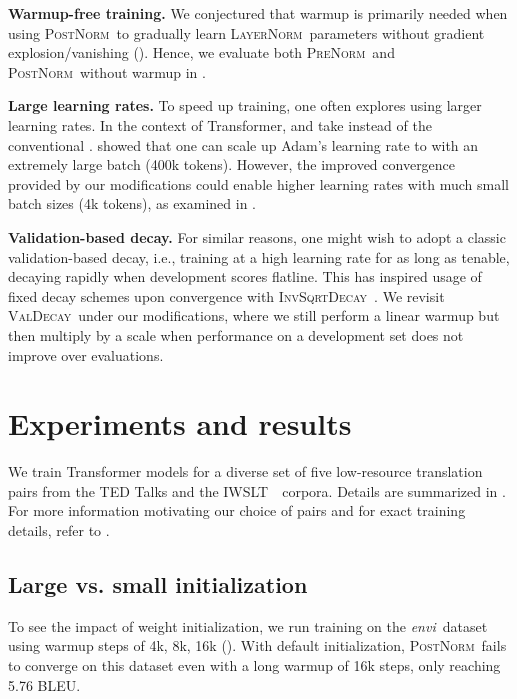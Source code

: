 \documentclass[11pt,a4paper]{article}
\newcommand{\enTOvi}{\textit{en\textrightarrow vi}}
\newcommand{\LNorm}{\textsc{LayerNorm}}
\newcommand{\PreNorm}{\textsc{PreNorm}}
\newcommand{\PostNorm}{\textsc{PostNorm}}
\newcommand{\ORGLR}{\textsc{InvSqrtDecay}}
\newcommand{\VALBASED}{\textsc{ValDecay}}
\newcommand{\IWSLT}{IWSLT\,\textquotesingle 15}
\renewcommand{\paragraph}[1]{\par\medskip\noindent\textbf{#1}}
\begin{document}
\paragraph{Warmup-free training.} We conjectured that warmup is primarily needed when using \PostNorm\ to gradually learn \LNorm\ parameters without gradient explosion/vanishing (). Hence, we evaluate both \PreNorm\ and \PostNorm\ without warmup in .

\paragraph{Large learning rates.} To speed up training, one often explores using larger learning rates. In the context of Transformer, \citet{Ott2018} and \citet{Aharoni2019} take  instead of the conventional . \citet{Ott2018} showed that one can scale up Adam's learning rate to  with an extremely large batch (400k tokens). However, the improved convergence provided by our modifications could enable higher learning rates with much small batch sizes (4k tokens), as examined in .

\paragraph{Validation-based decay.} For similar reasons, one might wish to adopt a classic validation-based decay, i.e., training at a high learning rate for as long as tenable, decaying rapidly when development scores flatline. This has inspired usage of fixed decay schemes upon convergence with \ORGLR\ \cite{Dong2018, Salazar2019}. We revisit \VALBASED\ under our modifications, where we still perform a linear warmup but then multiply by a scale  when performance on a development set does not improve over  evaluations.
 \section{Experiments and results}
\label{sec:experiments}
We train Transformer models for a diverse set of five low-resource translation pairs from the TED Talks \cite{Qi2018-word-embeddings-nmt} and the \IWSLT\ \cite{Cettolo2015} corpora. Details are summarized in . For more information motivating our choice of pairs and for exact training details, refer to .

\subsection{Large vs. small initialization} \label{experiment_weight_init}
To see the impact of weight initialization, we run training on the \enTOvi\ dataset using warmup steps of {4k, 8k, 16k} (). With default initialization, \PostNorm\ fails to converge on this dataset even with a long warmup of 16k steps, only reaching 5.76 BLEU.
\end{document}
